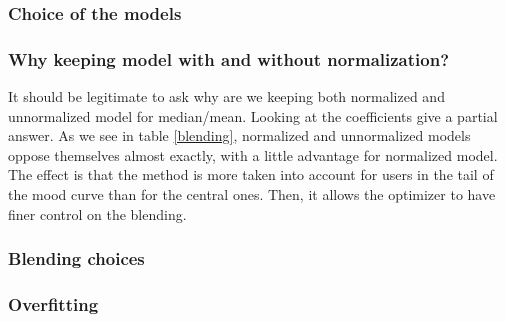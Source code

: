 \documentclass[10pt,conference,compsocconf]{IEEEtran}
\begin{document}
\subsubsection{Choice of the models}

\subsubsection{Why keeping model with and without normalization?}

It should be legitimate to ask why are we keeping both normalized and unnormalized model for
median/mean. Looking at the coefficients give a partial answer. As we see in table \ref{blending}, normalized and unnormalized models oppose themselves almost exactly, with a little advantage for normalized model. The effect is that the method is more taken into account for users in the tail of the mood curve than for the central ones. Then, it allows the optimizer to have finer control on the blending.

\subsubsection{Blending choices}


\subsubsection{Overfitting}








\end{document}

